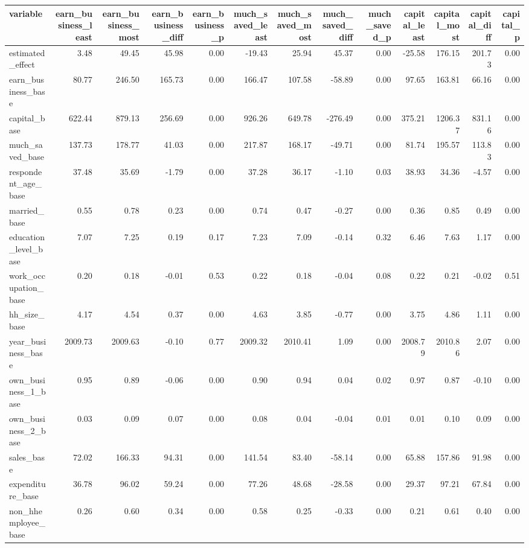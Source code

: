 
\begin{tabular}{lrrrrrrrrrrrr}
\toprule
variable & earn\_business\_least & earn\_business\_most & earn\_business\_diff & earn\_business\_p & much\_saved\_least & much\_saved\_most & much\_saved\_diff & much\_saved\_p & capital\_least & capital\_most & capital\_diff & capital\_p\\
\midrule
estimated\_effect & 3.48 & 49.45 & 45.98 & 0.00 & -19.43 & 25.94 & 45.37 & 0.00 & -25.58 & 176.15 & 201.73 & 0.00\\
earn\_business\_base & 80.77 & 246.50 & 165.73 & 0.00 & 166.47 & 107.58 & -58.89 & 0.00 & 97.65 & 163.81 & 66.16 & 0.00\\
capital\_base & 622.44 & 879.13 & 256.69 & 0.00 & 926.26 & 649.78 & -276.49 & 0.00 & 375.21 & 1206.37 & 831.16 & 0.00\\
much\_saved\_base & 137.73 & 178.77 & 41.03 & 0.00 & 217.87 & 168.17 & -49.71 & 0.00 & 81.74 & 195.57 & 113.83 & 0.00\\
respondent\_age\_base & 37.48 & 35.69 & -1.79 & 0.00 & 37.28 & 36.17 & -1.10 & 0.03 & 38.93 & 34.36 & -4.57 & 0.00\\
\addlinespace
married\_base & 0.55 & 0.78 & 0.23 & 0.00 & 0.74 & 0.47 & -0.27 & 0.00 & 0.36 & 0.85 & 0.49 & 0.00\\
education\_level\_base & 7.07 & 7.25 & 0.19 & 0.17 & 7.23 & 7.09 & -0.14 & 0.32 & 6.46 & 7.63 & 1.17 & 0.00\\
work\_occupation\_base & 0.20 & 0.18 & -0.01 & 0.53 & 0.22 & 0.18 & -0.04 & 0.08 & 0.22 & 0.21 & -0.02 & 0.51\\
hh\_size\_base & 4.17 & 4.54 & 0.37 & 0.00 & 4.63 & 3.85 & -0.77 & 0.00 & 3.75 & 4.86 & 1.11 & 0.00\\
year\_business\_base & 2009.73 & 2009.63 & -0.10 & 0.77 & 2009.32 & 2010.41 & 1.09 & 0.00 & 2008.79 & 2010.86 & 2.07 & 0.00\\
\addlinespace
own\_business\_1\_base & 0.95 & 0.89 & -0.06 & 0.00 & 0.90 & 0.94 & 0.04 & 0.02 & 0.97 & 0.87 & -0.10 & 0.00\\
own\_business\_2\_base & 0.03 & 0.09 & 0.07 & 0.00 & 0.08 & 0.04 & -0.04 & 0.01 & 0.01 & 0.10 & 0.09 & 0.00\\
sales\_base & 72.02 & 166.33 & 94.31 & 0.00 & 141.54 & 83.40 & -58.14 & 0.00 & 65.88 & 157.86 & 91.98 & 0.00\\
expenditure\_base & 36.78 & 96.02 & 59.24 & 0.00 & 77.26 & 48.68 & -28.58 & 0.00 & 29.37 & 97.21 & 67.84 & 0.00\\
non\_hhemployee\_base & 0.26 & 0.60 & 0.34 & 0.00 & 0.58 & 0.25 & -0.33 & 0.00 & 0.21 & 0.61 & 0.40 & 0.00\\

\end{tabular}
